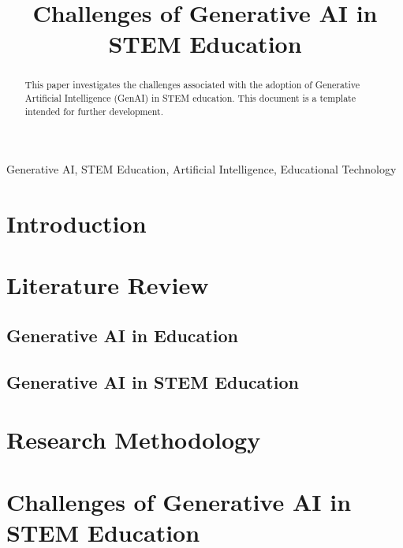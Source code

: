 \documentclass[conference]{IEEEtran}
\begin{document}
\title{Challenges of Generative AI in STEM Education}

\author{
}

\maketitle

\begin{abstract}
This paper investigates the challenges associated with the adoption of Generative Artificial Intelligence (GenAI) in STEM education. This document is a template intended for further development.
\end{abstract}

\begin{IEEEkeywords}
Generative AI, STEM Education, Artificial Intelligence, Educational Technology
\end{IEEEkeywords}

\section{Introduction}

\section{Literature Review}
\subsection{Generative AI in Education}

\subsection{Generative AI in STEM Education}

\section{Research Methodology}

\section{Challenges of Generative AI in STEM Education}
\end{document}
